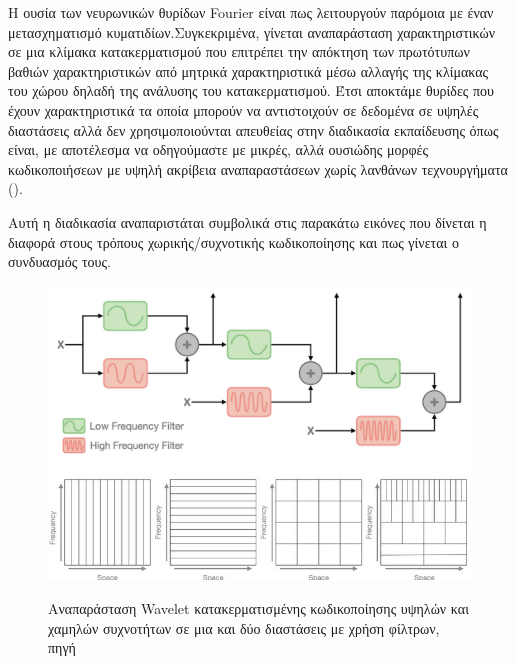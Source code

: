     Η ουσία των νευρωνικών θυρίδων Fourier είναι πως λειτουργούν παρόμοια με έναν μετασχηματισμό κυματιδίων.Συγκεκριμένα, γίνεται αναπαράσταση χαρακτηριστικών σε μια κλίμακα κατακερματισμού που επιτρέπει την απόκτηση των πρωτότυπων βαθιών χαρακτηριστικών από μητρικά χαρακτηριστικά μέσω αλλαγής της κλίμακας του χώρου δηλαδή της ανάλυσης του κατακερματισμού. Έτσι αποκτάμε θυρίδες που έχουν χαρακτηριστικά τα οποία μπορούν να αντιστοιχούν σε δεδομένα σε υψηλές διαστάσεις αλλά δεν χρησιμοποιούνται απευθείας στην διαδικασία εκπαίδευσης όπως είναι, με αποτέλεσμα να οδηγούμαστε με μικρές, αλλά ουσιώδης μορφές κωδικοποιήσεων με υψηλή ακρίβεια αναπαραστάσεων χωρίς λανθάνων τεχνουργήματα ().

    Αυτή η διαδικασία αναπαριστάται συμβολικά στις παρακάτω εικόνες που δίνεται η διαφορά στους τρόπους χωρικής/συχνοτικής κωδικοποίησης και πως γίνεται ο συνδυασμός τους.
    
    \begin{figure}[H]
        \centering
        \includegraphics[width=0.8\linewidth]{images/chapter2_img/LowFreqHighFreqNFFBSignalDecomposition.jpg}
        \includegraphics[width=0.8\linewidth]{images/chapter2_img/spatial-frequency_decomposition.jpg}
        \caption{Αναπαράσταση Wavelet κατακερματισμένης κωδικοποίησης υψηλών και χαμηλών συχνοτήτων  σε μια και δύο διαστάσεις με χρήση φίλτρων, πηγή \cite{wu2023neural}}
        \label{fig:nffbdecomp}
    \end{figure}
    \clearpage